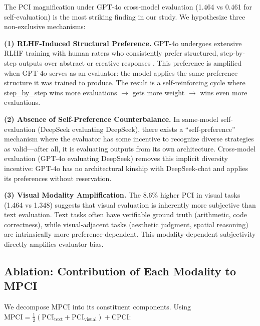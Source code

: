 \documentclass[11pt,a4paper]{article}
\begin{document}
The PCI magnification under GPT-4o cross-model evaluation (1.464 vs 0.461 for self-evaluation) is the most striking finding in our study. We hypothesize three non-exclusive mechanisms:

\textbf{(1) RLHF-Induced Structural Preference.} GPT-4o undergoes extensive RLHF training with human raters who consistently prefer structured, step-by-step outputs over abstract or creative responses \cite{openai2024gpt4o}. This preference is amplified when GPT-4o serves as an evaluator: the model applies the same preference structure it was trained to produce. The result is a self-reinforcing cycle where step\_by\_step wins more evaluations $\rightarrow$ gets more weight $\rightarrow$ wins even more evaluations.

\textbf{(2) Absence of Self-Preference Counterbalance.} In same-model self-evaluation (DeepSeek evaluating DeepSeek), there exists a ``self-preference'' mechanism where the evaluator has some incentive to recognize diverse strategies as valid---after all, it is evaluating outputs from its own architecture. Cross-model evaluation (GPT-4o evaluating DeepSeek) removes this implicit diversity incentive: GPT-4o has no architectural kinship with DeepSeek-chat and applies its preferences without reservation.

\textbf{(3) Visual Modality Amplification.} The 8.6\% higher PCI in visual tasks (1.464 vs 1.348) suggests that visual evaluation is inherently more subjective than text evaluation. Text tasks often have verifiable ground truth (arithmetic, code correctness), while visual-adjacent tasks (aesthetic judgment, spatial reasoning) are intrinsically more preference-dependent. This modality-dependent subjectivity directly amplifies evaluator bias.


\subsection{Ablation: Contribution of Each Modality to MPCI}

We decompose MPCI into its constituent components. Using $\text{MPCI} = \frac{1}{2}(\text{PCI}_{\text{text}} + \text{PCI}_{\text{visual}}) + \text{CPCI}$:
\end{document}
